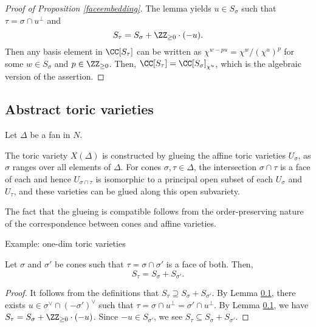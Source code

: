 \begin{proof}[Proof of Proposition \ref{faceembedding}]
The lemma yields $u \in S_\sigma$ such that $\tau=\sigma\cap u^\perp$ and
$$S_\tau = S_\sigma + \ZZ_{\ge 0} \cdot (-u).$$
Then any basis element in $\CC[S_\tau]$ can be written as $\chi^{w - p u} = \chi^w / (\chi^u)^p$ for some $w \in S_\sigma$ and $p \in \ZZ_{\ge 0}$.
Then, $\CC[S_\tau] = \CC[S_\sigma]_{\chi^u}$, which is the algebraic version of the assertion.
\end{proof}





\subsection{Abstract toric varieties}
Let $\Delta$ be a fan in $N$.

\begin{definition}
The toric variety $X(\Delta)$ is constructed by glueing the affine toric varieties $U_\sigma$, as $\sigma$ ranges over all elements of $\Delta$.
For cones $\sigma, \tau \in \Delta$, the intersection $\sigma \cap \tau$ is a face of each and hence $U_{\sigma \cap \tau}$ is isomorphic to a principal open subset of each $U_\sigma$ and $U_\tau$, and these varieties can be glued along this open subvariety.
\end{definition}

The fact that the glueing is compatible follows from the order-preserving nature of the correspondence between cones and affine varieties.

Example: one-dim toric varieties

\begin{proposition}
Let $\sigma$ and $\sigma'$ be cones such that $\tau = \sigma \cap \sigma'$ is a face of both.
Then,
$$S_\tau = S_\sigma + S_{\sigma'}.$$
\end{proposition}
\begin{proof}
It follows from the definitions that $S_\tau \supseteq S_\sigma + S_{\sigma'}$.
By Lemma \ref{}, there exists $u \in \sigma^\vee \cap (-\sigma')^\vee$ such that $\tau = \sigma \cap u^\perp = \sigma' \cap u^\perp$.
By Lemma \ref{}, we have $S_\tau = S_\sigma + \ZZ_{\ge 0} \cdot (-u)$.
Since $-u \in S_{\sigma'}$, we see $S_\tau \subseteq S_\sigma + S_{\sigma'}.$
\end{proof}



